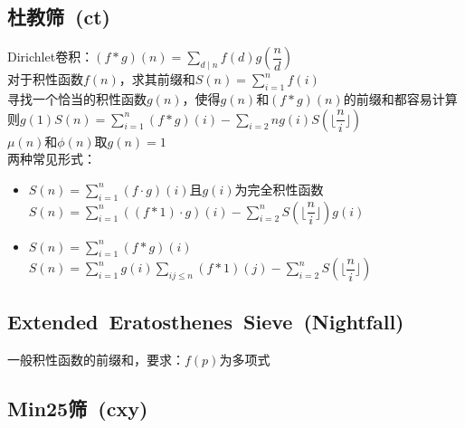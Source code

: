     \subsection*{杜教筛\ \small(ct)}
        \noindent Dirichlet卷积：$ (f \ast g) (n) = \sum\limits_{d \mid n}^{} f(d) g(\dfrac{n}{d}) $
        \\对于积性函数$ f(n) $，求其前缀和$ S(n) = \sum\limits_{i = 1}^{n} f(i) $
        \\寻找一个恰当的积性函数$ g(n) $，使得$ g(n) $和$ (f \ast g) (n) $的前缀和都容易计算
        \\则$ g(1) S(n) = \sum\limits_{i = 1}^{n} (f \ast g) (i) - \sum\limits_{i = 2}{n} g(i) S(\lfloor \dfrac{n}{i} \rfloor) $
        \\$ \mu (n) $和$ \phi (n) $取$ g(n) = 1 $
        \\两种常见形式：
        \begin{itemize}[wide=0pt]
            \item $ S(n) = \sum\limits_{i = 1}^{n} (f \cdot g) (i) $且$ g(i) $为完全积性函数
                \\$ S(n) = \sum\limits_{i = 1}^{n} ((f \ast 1) \cdot g) (i) - \sum\limits_{i = 2}^{n} S(\lfloor \dfrac{n}{i} \rfloor) g(i) $
            \item $ S(n) = \sum\limits_{i = 1}^{n} (f \ast g) (i) $
                \\$ S(n) = \sum\limits_{i = 1}^{n} g (i) \sum\limits_{ij \leq n}^{} (f \ast 1) (j) - \sum\limits_{i = 2}^{n} S(\lfloor \dfrac{n}{i} \rfloor) $
        \end{itemize}

    \subsection*{Extended\ Eratosthenes\ Sieve\ \small(Nightfall)}
        一般积性函数的前缀和，要求：$ f(p) $为多项式

    \subsection*{Min25筛\ \small(cxy)}
